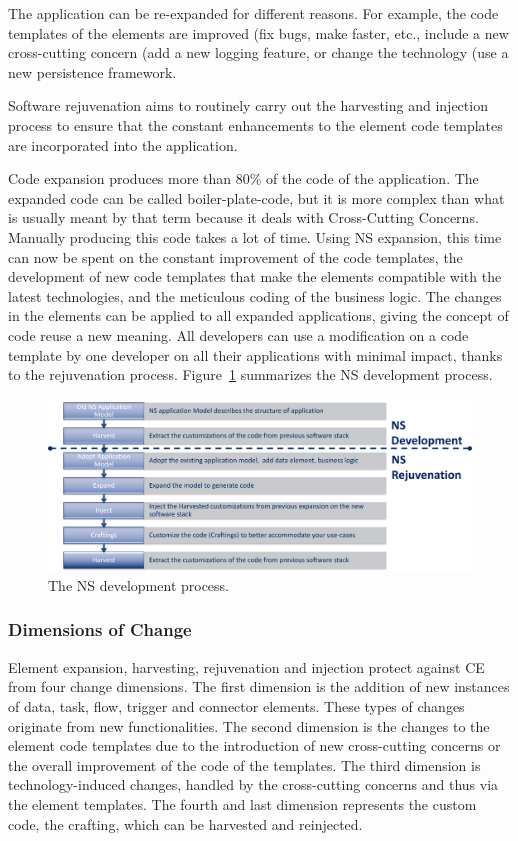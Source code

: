 The application can be re-expanded for different reasons. For example, the code templates
of the elements are improved (fix bugs, make faster, etc., include a new cross-cutting
concern (add a new logging feature, or change the technology (use a new persistence
framework.

Software rejuvenation aims to routinely carry out the harvesting and injection process to
ensure that the constant enhancements to the element code templates are incorporated into
the application.

Code expansion produces more than 80\% of the code of the application. The expanded code
can be called boiler-plate-code, but it is more complex than what is usually meant by that
term because it deals with Cross-Cutting Concerns. Manually producing this code takes a
lot of time. Using NS expansion, this time can now be spent on the constant improvement of
the code templates, the development of new code templates that make the elements
compatible with the latest technologies, and the meticulous coding of the business logic.
The changes in the elements can be applied to all expanded applications, giving the
concept of code reuse a new meaning. All developers can use a modification on a code
template by one developer on all their applications with minimal impact, thanks to the
rejuvenation process. Figure~\ref{fig_2} summarizes the NS development process.
\begin{figure}[htbp]
\centering
\centerline{\includegraphics[scale=0.65]{figures/Picture2.png}}
\caption{The NS development process.}
\label{fig_2}
\end{figure}
%
%
\subsubsection{Dimensions of Change}\label{Dimensions of Change} Element expansion,
harvesting, rejuvenation and injection protect against CE from four change dimensions. The
first dimension is the addition of new instances of data, task, flow, trigger and
connector elements. These types of changes originate from new functionalities. The second
dimension is the changes to the element code templates due to the introduction of new
cross-cutting concerns or the overall improvement of the code of the templates. The third
dimension is technology-induced changes, handled by the cross-cutting concerns and thus
via the element templates. The fourth and last dimension represents the custom code, the
crafting, which can be harvested and reinjected.
